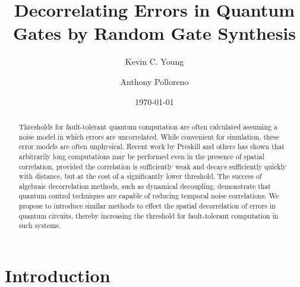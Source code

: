 \documentclass[aps,nofootinbib,pra,notitlepage,twocolumn]{revtex4-1}
\begin{document}
\title{Decorrelating Errors in Quantum Gates by Random Gate Synthesis}

\author{Kevin C. Young}

\author{Anthony Polloreno}

\date{\today}

\begin{abstract}
Thresholds for fault-tolerant quantum computation are often calculated assuming a noise model in which errors are uncorrelated. While convenient for simulation, these error models are often unphysical. Recent work by Preskill and others has shown that arbitrarily long computations may be performed even in the presence of spatial correlation, provided the correlation is sufficiently weak and decays sufficiently quickly with distance, but at the cost of a significantly lower threshold. The success of algebraic decorrelation methods, such as dynamical decoupling, demonstrate that quantum control techniques are capable of reducing temporal noise correlations. We propose to introduce similar methods to effect the spatial decorrelation of errors in quantum circuits, thereby increasing the threshold for fault-tolerant computation in such systems.
\end{abstract}

\pacs{}

\maketitle

\section{Introduction}

\end{document}
